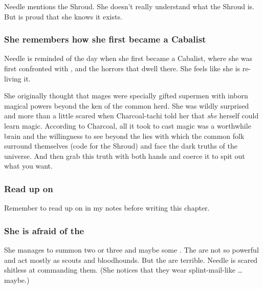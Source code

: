 Needle mentions the Shroud. 
She doesn't really understand what the Shroud is. 
But is proud that she knows it exists. 





\subsubsection{She remembers how she first became a Cabalist}
Needle is reminded of the day when she first became a Cabalist, where she was first confronted with \itzach, \Nyx{} and the horrors that dwell there. 
She feels like she is re-living it. 


She originally thought that mages were specially gifted supermen with inborn magical powers beyond the ken of the common herd. 
She was wildly surprised and more than a little scared when Charcoal-tachi told her that \emph{she} herself could learn magic. 
According to Charcoal, all it took to cast magic was a worthwhile brain and the willingness to see beyond the lies with which the common folk surround themselves (code for the Shroud) and face the dark truths of the universe. 
And then grab this truth with both hands and coerce it to spit out what you want. 





\subsubsection{Read up on \banes}
Remember to read up on \banes{} in my notes before writing this chapter. 





\subsubsection{She is afraid of the \banes}
She manages to summon two or three \lesserbanes{} and maybe some \banerats. 
The \banerats{} are not so powerful and act mostly as scouts and bloodhounds. 
But the \banes{} are terrible. 
Needle is scared shitless at commanding them. 
(She notices that they wear splint-mail-like \armour\ldots{} maybe.)

